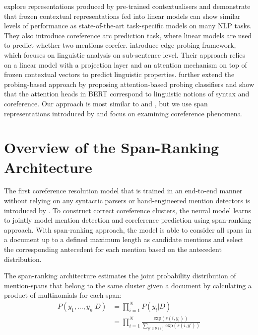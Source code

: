 \documentclass[11pt]{article}
\begin{document}
\textcite{liu2019linguistic} explore representations produced by pre-trained contextualisers and demonstrate that frozen contextual representations fed into linear models can show similar levels of performance as state-of-the-art task-specific models on many NLP tasks. They also introduce coreference arc prediction task, where linear models are used to predict whether two mentions corefer. \textcite{tenney2019context} introduce edge probing framework, which focuses on linguistic analysis on sub-sentence level. Their approach relies on a linear model with a projection layer and an attention mechanism on top of frozen contextual vectors to predict linguistic properties. \textcite{clark2019what} further extend the probing-based approach by proposing attention-based probing classifiers and show that the attention heads in BERT correspond to linguistic notions of syntax and coreference. Our approach is most similar to \textcite{liu2019linguistic} and \textcite{tenney2019context}, but we use span representations introduced by \textcite{lee2017end} and focus on examining coreference phenomena.




\section{Overview of the Span-Ranking Architecture}
The first coreference resolution model that is trained in an end-to-end manner without relying on any syntactic parsers or hand-engineered mention detectors is introduced by \textcite{lee2017end}. To construct correct coreference clusters, the neural model learns to jointly model mention detection and coreference prediction using span-ranking approach.  With span-ranking approach, the model is able to consider all spans in a document up to a defined maximum length as candidate mentions and select the corresponding antecedent for each mention based on the antecedent distribution.

The span-ranking architecture estimates the joint probability distribution of mention-spans that belong to the same cluster given a document by calculating a product of multinomials for each span:
\begin{align}
P(y_{1}, ..., y_{n}|D) &= \prod\limits_{i=1}^{N} P(y_{i}|D) \\
&= \prod\limits_{i=1}^{N} \frac{\text{exp}(s(i, y_{i}))}{\sum_{y' \in \mathcal{Y}(i)} \text{exp}(s(i, y'))}
\end{align}
\end{document}
